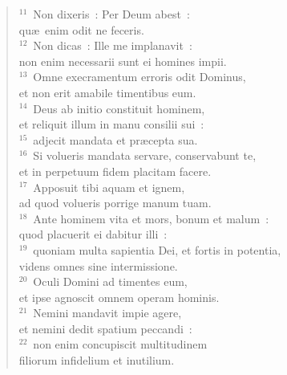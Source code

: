 \begin{verse}${}^{11}$~Non dixeris~: Per Deum abest~:\\ qu\ae\ enim odit ne feceris.\\
${}^{12}$~Non dicas~: Ille me implanavit~:\\ non enim necessarii sunt ei homines impii.\\
${}^{13}$~Omne execramentum erroris odit Dominus,\\ et non erit amabile timentibus eum.\\
${}^{14}$~Deus ab initio constituit hominem,\\ et reliquit illum in manu consilii sui~:\\
${}^{15}$~adjecit mandata et pr\ae cepta sua.\\
${}^{16}$~Si volueris mandata servare, conservabunt te,\\ et in perpetuum fidem placitam facere.\\
${}^{17}$~Apposuit tibi aquam et ignem,\\ ad quod volueris porrige manum tuam.\\
${}^{18}$~Ante hominem vita et mors, bonum et malum~:\\ quod placuerit ei dabitur illi~:\\
${}^{19}$~quoniam multa sapientia Dei, et fortis in potentia,\\ videns omnes sine intermissione.\\
${}^{20}$~Oculi Domini ad timentes eum,\\ et ipse agnoscit omnem operam hominis.\\
${}^{21}$~Nemini mandavit impie agere,\\ et nemini dedit spatium peccandi~:\\
${}^{22}$~non enim concupiscit multitudinem\\ filiorum infidelium et inutilium.\end{verse}


